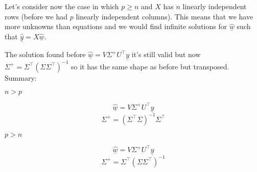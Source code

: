 Let's consider now the case in which $p \geq n$ and $X$ has $n$ linearly independent rows (before we had $p$ linearly independent columns). This means that we have more unknowns than equations and we would find infinite solutions for $\underline{\hat{w}}$ such that $\underline{\hat{y}} = X\underline{\hat{w}}$. 

The solution found before $\underline{\hat{w}} = V\Sigma^+ U^\intercal \underline{y}$ it's still valid but now $\Sigma^+ = \Sigma^\intercal(\Sigma\Sigma^\intercal)^{-1}$ so it has the same shape as before but transposed. 
Summary:
\begin{multicols}{2}
    \begin{center}
        $n > p$\\
        \vspace{0.3cm}
        \[
            \underline{\hat{w}} = V\Sigma^+ U^\intercal \underline{y}    
        \]
        \[
            \Sigma^+ = (\Sigma^\intercal \Sigma)^{-1} \Sigma^\intercal
        \]
    \end{center}
    \newcolumn
    \begin{center}
        $p > n$\\
        \vspace{0.3cm}
        \[
            \underline{\hat{w}} = V\Sigma^+ U^\intercal \underline{y}    
        \]
        \[
            \Sigma^+ = \Sigma^\intercal(\Sigma\Sigma^\intercal)^{-1}    
        \]

    \end{center}
\end{multicols}

